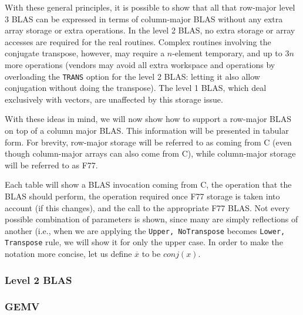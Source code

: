 \documentclass{article}
\begin{document}
With these general principles, it is possible to show that all that 
row-major level 3 BLAS can be expressed in terms of column-major BLAS without
any extra array storage or extra operations.  In the level 2 BLAS, no
extra storage or array accesses are required for the real routines.  Complex
routines involving the conjugate transpose, however, may require a
$n$-element temporary, and up to $3n$ more operations (vendors may avoid all
extra workspace and operations
by overloading the {\tt TRANS} option for the level 2 BLAS: letting it also
allow conjugation without doing the transpose).
The level 1 BLAS, which deal exclusively with vectors, are unaffected by
this storage issue.

With these ideas in mind, we will now show how to support a row-major BLAS
on top of a column major BLAS.
This information will be presented in tabular form.
For brevity, row-major storage will be referred to as coming from C (even
though column-major arrays can also come from C), while
column-major storage will be referred to as F77.

Each table will show a BLAS invocation coming from C, the operation that the
BLAS should perform, the operation required once F77 storage is taken
into account (if this changes), and the call to the appropriate F77 BLAS.
Not every possible
combination of parameters is shown, since many are simply reflections of
another (i.e., when we are applying the {\tt Upper, NoTranspose} becomes
{\tt Lower, Transpose} rule, we will show it for only the upper case.
In order to make the notation more concise, let us define $\overline{x}$
to be $conj(x)$.

\subsubsection{Level 2 BLAS}
\subsubsection{GEMV}
\end{document}
